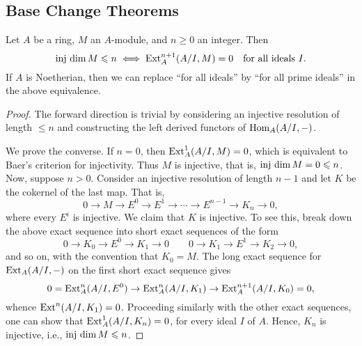 \subsection{Base Change Theorems}

\begin{lemma}
    Let $A$ be a ring, $M$ an $A$-module, and $n\ge 0$ an integer. Then 
    \begin{equation*}
        \operatorname{inj~dim} M\leqslant n\iff \operatorname{Ext}^{n + 1}_A(A/I, M) = 0\quad\text{for all ideals } I.
    \end{equation*}
    If $A$ is Noetherian, then we can replace ``for all ideals'' by ``for all prime ideals'' in the above equivalence.
\end{lemma}
\begin{proof}
    The forward direction is trivial by considering an injective resolution of length $\le n$ and constructing the left derived functors of $\operatorname{Hom}_A(A/I, -)$.

    We prove the converse. If $n = 0$, then $\operatorname{Ext}^1_A(A/I, M) = 0$, which is equivalent to Baer's criterion for injectivity. Thus $M$ is injective, that is, $\operatorname{inj~dim} M = 0\leqslant n$. Now, suppose $n > 0$. Consider an injective resolution of length $n - 1$ and let $K$ be the cokernel of the last map. That is, 
    \begin{equation*}
        0\to M\to E^0\to E^1\to\cdots\to E^{n - 1}\to K_n\to 0,
    \end{equation*}
    where every $E^i$ is injective. We claim that $K$ is injective. To see this, break down the above exact sequence into short exact sequences of the form 
    \begin{equation*}
        0\to K_0\to E^0\to K_1\to 0\qquad 0\to K_1\to E^1\to K_2\to 0,
    \end{equation*}
    and so on, with the convention that $K_0 = M$. The long exact sequence for $\operatorname{Ext}_A(A/I, -)$ on the first short exact sequence gives 
    \begin{equation*}
        0 = \operatorname{Ext}^n_A(A/I, E^0)\to\operatorname{Ext}^n_A(A/I, K_1)\to\operatorname{Ext}^{n + 1}_A(A/I, K_0) = 0,
    \end{equation*}
    whence $\operatorname{Ext}^n(A/I, K_1) = 0$. Proceeding similarly with the other exact sequences, one can show that $\operatorname{Ext}^1_A(A/I, K_n) = 0$, for every ideal $I$ of $A$. Hence, $K_n$ is injective, i.e., $\operatorname{inj~dim} M\leqslant n$.
\end{proof}


